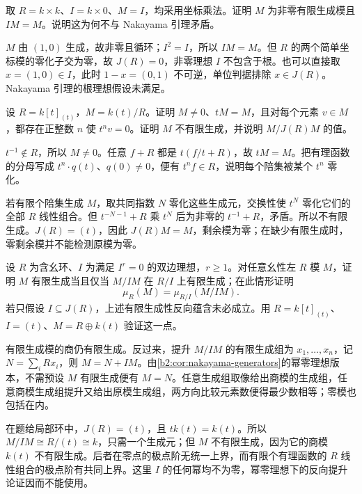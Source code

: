 \begin{exercise}\label{b2:ex:14-nakayama-radical-needed}
	取 \(R=k\times k\)、\(I=k\times0\)、\(M=I\)，均采用坐标乘法。证明 \(M\) 为非零有限生成模且 \(IM=M\)。说明这为何不与 Nakayama 引理矛盾。
\end{exercise}
\begin{solution}
	\(M\) 由 \((1,0)\) 生成，故非零且循环；\(I^2=I\)，所以 \(IM=M\)。但 \(R\) 的两个简单坐标模的零化子交为零，故 \(J(R)=0\)，非零理想 \(I\) 不包含于根。也可以直接取 \(x=(1,0)\in I\)，此时 \(1-x=(0,1)\) 不可逆，单位判据排除 \(x\in J(R)\)。Nakayama 引理的根理想假设未满足。
\end{solution}

\begin{exercise}\label{b2:ex:14-nakayama-finite-needed}
	设 \(R=k[t]_{(t)}\)，\(M=k(t)/R\)。证明 \(M\ne0\)、\(tM=M\)，且对每个元素 \(v\in M\)，都存在正整数 \(n\) 使 \(t^nv=0\)。证明 \(M\) 不有限生成，并说明 \(M/J(R)M\) 的值。
\end{exercise}
\begin{solution}
	\(t^{-1}\notin R\)，所以 \(M\ne0\)。任意 \(f+R\) 都是 \(t(f/t+R)\)，故 \(tM=M\)。把有理函数的分母写成 \(t^n\cdot q(t)\)、\(q(0)\ne0\)，便有 \(t^nf\in R\)，说明每个陪集被某个 \(t^n\) 零化。

	若有限个陪集生成 \(M\)，取共同指数 \(N\) 零化这些生成元，交换性使 \(t^N\) 零化它们的全部 \(R\) 线性组合。但 \(t^{-N-1}+R\) 乘 \(t^N\) 后为非零的 \(t^{-1}+R\)，矛盾。所以不有限生成。\(J(R)=(t)\)，因此 \(J(R)M=M\)，剩余模为零；在缺少有限生成时，零剩余模并不能检测原模为零。
\end{solution}

\begin{exercise}\label{b2:ex:14-nilpotent-ideal-generators}
	设 \(R\) 为含幺环、\(I\) 为满足 \(I^r=0\) 的双边理想，\(r\ge1\)。对任意幺性左 \(R\) 模 \(M\)，证明 \(M\) 有限生成当且仅当 \(M/IM\) 在 \(R/I\) 上有限生成；在此情形证明
	\[
		\mu_R(M)=\mu_{R/I}(M/IM).
	\]
	若只假设 \(I\subseteq J(R)\)，上述有限生成性反向蕴含未必成立。用 \(R=k[t]_{(t)}\)、\(I=(t)\)、\(M=R\oplus k(t)\) 验证这一点。
\end{exercise}
\begin{solution}
	有限生成模的商仍有限生成。反过来，提升 \(M/IM\) 的有限生成组为 \(x_1,\ldots,x_n\)，记 \(N=\sum_iRx_i\)，则 \(M=N+IM\)。由\cref{b2:cor:nakayama-generators}的幂零理想版本，不需预设 \(M\) 有限生成便有 \(M=N\)。任意生成组取像给出商模的生成组，任意商模生成组提升又给出原模生成组，两方向比较元素数便得最少数相等；零模也包括在内。

	在题给局部环中，\(J(R)=(t)\)，且 \(tk(t)=k(t)\)。所以 \(M/IM\cong R/(t)\cong k\)，只需一个生成元；但 \(M\) 不有限生成，因为它的商模 \(k(t)\) 不有限生成。后者在零点的极点阶无统一上界，而有限个有理函数的 \(R\) 线性组合的极点阶有共同上界。这里 \(I\) 的任何幂均不为零，幂零理想下的反向提升论证因而不能使用。
\end{solution}

